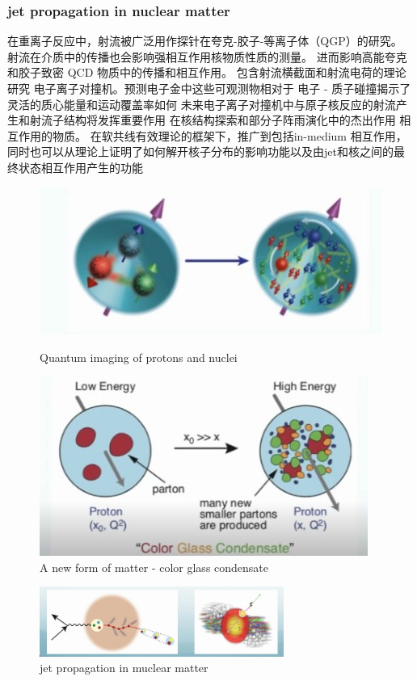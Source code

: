 \documentclass[12pt, a4paper, oneside]{ctexart}
\begin{document}
\begin{spacing}{2.0}
\subsubsection{jet propagation in nuclear matter}
在重离子反应中，射流被广泛用作探针在夸克-胶子-等离子体（QGP）的研究。
射流在介质中的传播也会影响强相互作用核物质性质的测量。
进而影响高能夸克和胶子致密 QCD 物质中的传播和相互作用。 \cite{Ovanesyan_2011}
包含射流横截面和射流电荷的理论研究
电子离子对撞机。预测电子金中这些可观测物相对于
电子 - 质子碰撞揭示了灵活的质心能量和运动覆盖率如何
未来电子离子对撞机中与原子核反应的射流产生和射流子结构将发挥重要作用
在核结构探索和部分子阵雨演化中的杰出作用
相互作用的物质。 在软共线有效理论的框架下，推广到包括in-medium
相互作用，
同时也可以从理论上证明了如何解开核子分布的影响功能以及由jet和核之间的最终状态相互作用产生的功能\cite{PhysRevLett.126.252001}
\begin{figure}
    \begin{minipage}[t]{0.5\linewidth}
        \centering
        \includegraphics[scale=0.3]{kappa.jpg}
        \caption{Quantum imaging of protons and nuclei}
        \label{fig:side:a}
      \end{minipage}%
      \begin{minipage}[t]{0.5\linewidth}
        \centering
        \includegraphics[scale=0.3]{mu.jpg}
        \caption{A new form of matter - color glass condensate}
        \label{fig:side:b}
      \end{minipage}
\end{figure}
\begin{figure}
    \centering
    \includegraphics[width=8cm]{nu.jpg}
    \caption{jet propagation in muclear matter}
\end{figure}


\end{spacing}
\end{document}
